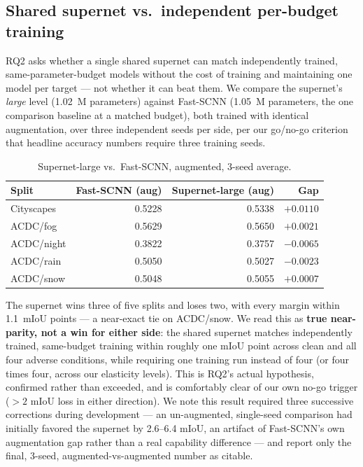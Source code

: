\documentclass[a4paper,review,12pt]{elsarticle}
\begin{document}
\subsection{Shared supernet vs.\ independent per-budget training}
\label{sec:go-no-go}

RQ2 asks whether a single shared supernet can match independently trained,
same-parameter-budget models without the cost of training and maintaining one
model per target --- not whether it can beat them. We compare the supernet's
\emph{large} level (1.02~M parameters) against Fast-SCNN (1.05~M parameters,
the one comparison baseline at a matched budget), both trained with identical
augmentation, over three independent seeds per side, per our go/no-go
criterion that headline accuracy numbers require three training seeds.

\begin{table}[h]
\centering
\caption{Supernet-large vs.\ Fast-SCNN, augmented, 3-seed average.}
\label{tab:go-no-go}
\begin{tabular}{lrrr}
\toprule
Split & Fast-SCNN (aug) & Supernet-large (aug) & Gap \\
\midrule
Cityscapes  & 0.5228 & 0.5338 & $+0.0110$ \\
ACDC/fog    & 0.5629 & 0.5650 & $+0.0021$ \\
ACDC/night  & 0.3822 & 0.3757 & $-0.0065$ \\
ACDC/rain   & 0.5050 & 0.5027 & $-0.0023$ \\
ACDC/snow   & 0.5048 & 0.5055 & $+0.0007$ \\
\bottomrule
\end{tabular}
\end{table}

The supernet wins three of five splits and loses two, with every margin
within 1.1~mIoU points --- a near-exact tie on ACDC/snow. We read this as
\textbf{true near-parity, not a win for either side}: the shared supernet
matches independently trained, same-budget training within roughly one mIoU
point across clean and all four adverse conditions, while requiring one
training run instead of four (or four times four, across our elasticity
levels). This is RQ2's actual hypothesis, confirmed rather than exceeded, and
is comfortably clear of our own no-go trigger ($>2$ mIoU loss in either
direction). We note this result required three successive corrections during
development --- an un-augmented, single-seed comparison had initially favored
the supernet by 2.6--6.4 mIoU, an artifact of Fast-SCNN's own augmentation gap
rather than a real capability difference --- and report only the final,
3-seed, augmented-vs-augmented number as citable.
\end{document}
